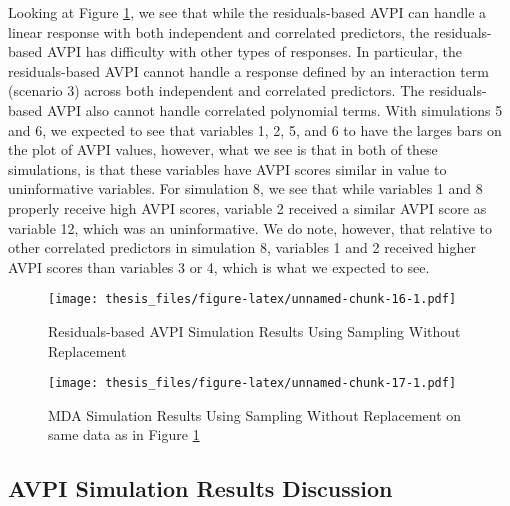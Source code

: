 \documentclass[12pt,twoside]{reedthesis}
\theoremstyle{definition}
\theoremstyle{definition}
\theoremstyle{definition}
\theoremstyle{remark}
\begin{document}
Looking at Figure \ref{resAVPI}, we see that while the residuals-based
AVPI can handle a linear response with both independent and correlated
predictors, the residuals-based AVPI has difficulty with other types of
responses. In particular, the residuals-based AVPI cannot handle a
response defined by an interaction term (scenario 3) across both
independent and correlated predictors. The residuals-based AVPI also
cannot handle correlated polynomial terms. With simulations 5 and 6, we
expected to see that variables 1, 2, 5, and 6 to have the larges bars on
the plot of AVPI values, however, what we see is that in both of these
simulations, is that these variables have AVPI scores similar in value
to uninformative variables. For simulation 8, we see that while
variables 1 and 8 properly receive high AVPI scores, variable 2 received
a similar AVPI score as variable 12, which was an uninformative. We do
note, however, that relative to other correlated predictors in
simulation 8, variables 1 and 2 received higher AVPI scores than
variables 3 or 4, which is what we expected to see. \par
\begin{figure}
\centering
\texttt{[image: thesis\_files/figure-latex/unnamed-chunk-16-1.pdf]}
\caption{\label{fig:unnamed-chunk-16}\label{resAVPI}Residuals-based AVPI
Simulation Results Using Sampling Without Replacement}
\end{figure}
\begin{figure}
\centering
\texttt{[image: thesis\_files/figure-latex/unnamed-chunk-17-1.pdf]}
\caption{\label{fig:unnamed-chunk-17}\label{MDAwrep2}MDA Simulation Results
Using Sampling Without Replacement on same data as in Figure
\ref{resAVPI}}
\end{figure}
\subsection{AVPI Simulation Results
Discussion}\label{avpi-simulation-results-discussion}
\end{document}
